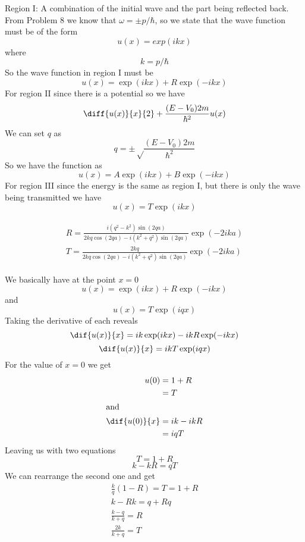 \begin{ans}
	Region I:
	A combination of the initial wave and the part being reflected back. 
	From Problem 8 we know that $ \omega = \pm p/\hbar $, so we state that the wave function must be of the form 
	\[ u(x) = exp(ikx) \]
	where 
	\[ k = p/\hbar \]
	So the wave function in region I must be 
	$$ u(x) = \exp(ikx) + R\exp(-ikx) $$
	For region II since there is a potential so we have
	\[ \diff{u(x)}{x}{2} + \frac{(E-V_0) 2m}{\hbar^2} u(x) \]
	We can set $ q $ as 
	\[ q = \pm \sqrt\frac{(E-V_0) 2m}{\hbar^2} \]
	So we have the function as
	\[ u(x) = A \exp (ikx) + B \exp (-ikx) \]
	For region III since the energy is the same as region I, but there is only the wave being transmitted we have 
	\[ u(x) = T \exp(ikx)\]
\end{ans}
\begin{ans}
	\begin{align}
	\begin{array} { c } { R = \frac { i \left( q ^ { 2 } - k ^ { 2 } \right) \sin ( 2 q a ) } { 2 k q \cos ( 2 q a ) - i \left( k ^ { 2 } + q ^ { 2 } \right) \sin ( 2 q a ) } \exp ( - 2 i k a ) } \\ { T = \frac { 2 k q } { 2 k q \cos ( 2 q a ) - i \left( k ^ { 2 } + q ^ { 2 } \right) \sin ( 2 q a ) } \exp ( - 2 i k a ) } \end{array}
	\end{align}
\end{ans}
\begin{ans}
	We basically have at the point $ x = 0 $
	\[ u(x) = \exp(ikx) + R \exp(-ikx) \]
	and
	\[ u(x) = T \exp(iqx) \]
	Taking the derivative of each reveals 
	\[ \dif{u(x)}{x} = ik\exp(ikx) - ikR \exp(-ikx) \]
	\[ \dif{u(x)}{x} = ik T \exp(iqx) \]
	For the value of $ x = 0 $ we get 
	\begin{align*}
	u(0) &= 1 + R \\
	&= T \\
	\intertext{and}
	\dif{u(0)}{x} &= ik - ikR \\
	&= iqT
	\end{align*}
	Leaving us with two equations
	\[ T = 1 + R \]
	\[ k - kR = qT \]
	We can rearrange the second one and get
	\begin{align*}
	\frac{k}{q} (1 - R) = T = 1 +R \\
	k - Rk = q + Rq \\
	\frac{k-q}{k+q} = R \\
	\frac{2k}{k+q} = T
	\end{align*}
\end{ans}
